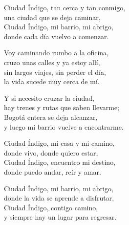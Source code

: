 \begin{lyrics}
Ciudad Índigo, tan cerca y tan conmigo,\\
una ciudad que se deja caminar,\\
Ciudad Índigo, mi barrio, mi abrigo,\\
donde cada día vuelvo a comenzar.

Voy caminando rumbo a la oficina,\\
cruzo unas calles y ya estoy allí,\\
sin largos viajes, sin perder el día,\\
la vida sucede muy cerca de mí.

Y si necesito cruzar la ciudad,\\
hay trenes y rutas que saben llevarme;\\
Bogotá entera se deja alcanzar,\\
y luego mi barrio vuelve a encontrarme.

Ciudad Índigo, mi casa y mi camino,\\
donde vivo, donde quiero estar,\\
Ciudad Índigo, encuentro mi destino,\\
donde puedo andar, reír y amar.

Ciudad Índigo, mi barrio, mi abrigo,\\
donde la vida se aprende a disfrutar,\\
Ciudad Índigo, contigo camino,\\
y siempre hay un lugar para regresar.
\end{lyrics}

